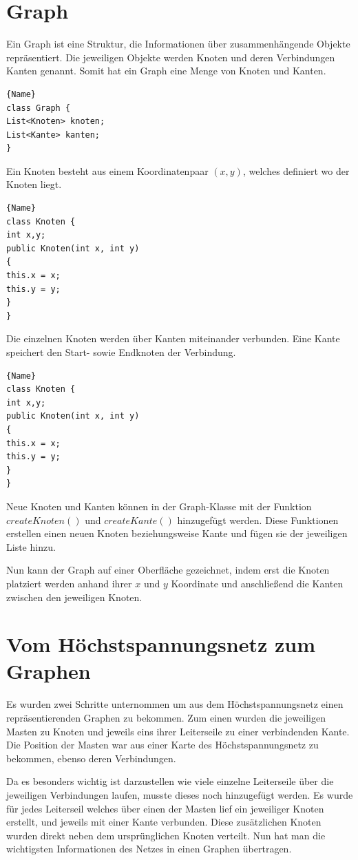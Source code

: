 \section{Graph}
\label{Graph}
%
Ein Graph ist eine Struktur, die Informationen über zusammenhängende Objekte repräsentiert. Die jeweiligen Objekte werden Knoten und deren Verbindungen Kanten genannt.
Somit hat ein Graph eine Menge von Knoten und Kanten.
\begin{lstlisting}[style=C++, caption=Struktur des Graphen]{Name}
class Graph {
List<Knoten> knoten;
List<Kante> kanten;
}
\end{lstlisting}
Ein Knoten besteht aus einem Koordinatenpaar $(x,y)$, welches definiert wo der Knoten liegt.
\begin{lstlisting}[style=C++, caption=Struktur eines Knotens]{Name}
class Knoten {
int x,y;
public Knoten(int x, int y)
{	
this.x = x;
this.y = y;
}	
}
\end{lstlisting}
Die einzelnen Knoten werden über Kanten miteinander verbunden. Eine Kante speichert den Start- sowie Endknoten der Verbindung.
\begin{lstlisting}[style=C++, caption=Struktur eines Knotens]{Name}
class Knoten {
int x,y;
public Knoten(int x, int y)
{	
this.x = x;
this.y = y;
}	
}
\end{lstlisting}
Neue Knoten und Kanten können in der Graph-Klasse mit der Funktion $createKnoten()$ und $createKante()$ hinzugefügt werden. Diese Funktionen erstellen einen neuen Knoten beziehungsweise Kante und fügen sie der jeweiligen Liste hinzu.

Nun kann der Graph auf einer Oberfläche gezeichnet, indem erst die Knoten platziert werden anhand ihrer $x$ und $y$ Koordinate und anschließend die Kanten zwischen den jeweiligen Knoten. 


\section{Vom Höchstspannungsnetz zum Graphen}
\label{Vom Höchstspannungsnetz zum Graphen}
%

Es wurden zwei Schritte unternommen um aus dem Höchstspannungsnetz einen repräsentierenden Graphen zu bekommen. Zum einen wurden die jeweiligen Masten zu Knoten und jeweils eins ihrer Leiterseile zu einer verbindenden Kante. Die Position der Masten war aus einer Karte des Höchstspannungsnetz zu bekommen, ebenso deren Verbindungen. 

Da es besonders wichtig ist darzustellen wie viele einzelne Leiterseile über die jeweiligen Verbindungen laufen, musste dieses noch hinzugefügt werden. Es wurde für jedes Leiterseil welches über einen der Masten lief ein jeweiliger Knoten erstellt, und jeweils mit einer Kante verbunden. Diese zusätzlichen Knoten wurden direkt neben dem ursprünglichen Knoten verteilt. Nun hat man die wichtigsten Informationen des Netzes in einen Graphen übertragen.

